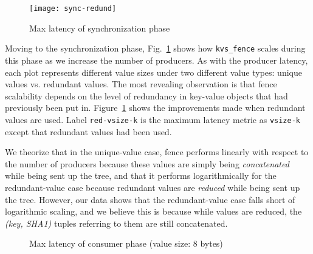 \begin{figure}
\centering
\texttt{[image: sync-redund]}
\caption{Max latency of synchronization phase}
\vspace{-.4cm}	
\label{fig:sync}
\end{figure}
 

Moving to the synchronization phase, Fig.~\ref{fig:sync} shows 
how {\tt kvs\_fence} scales during this phase
as we increase the number of producers. 
As with the producer latency,
each plot represents different value sizes under two different
value types: unique values vs. redundant values.
The most revealing observation is that
fence scalability depends on the level of
redundancy in key-value objects that had previously 
been put in. Figure~\ref{fig:sync} 
shows the improvements made when redundant values are used. 
Label {\tt red-vsize-k} is the maximum latency metric
as {\tt vsize-k} except that 
redundant values had been used.

We theorize that in the unique-value case, fence performs 
linearly with respect to the number of
producers because these values are simply being {\em concatenated} while
being sent up the tree, and that it performs logarithmically for the
redundant-value case
because redundant values are {\em reduced} while being sent 
up the tree. However, our data shows that the redundant-value case
falls short of logarithmic scaling, and we believe this is
because while values are reduced, the {\em (key, SHA1)} tuples
referring to them are still concatenated.

%
\begin{figure}[ht]
\centering
\begin{subfigure}[With single-directory layout]{
  \texttt{[image: consumer-1-dir]}
  \label{fig:cons:dir}
}%
\end{subfigure}
\begin{subfigure}[Improvements with multiple directories]{
  \texttt{[image: consumer-dist-dir]}
  \label{fig:cons:dirs}
}%
\end{subfigure}
\caption{Max latency of consumer phase (value size: 8 bytes)}
\vspace{-.3cm}
\label{fig:consumer}
\end{figure}

